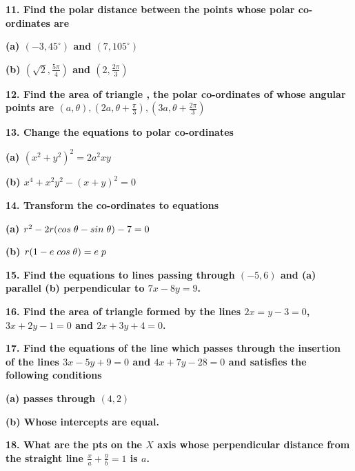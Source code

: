 \documentclass{article}
\begin{document}
\begin{flushleft}
\vspace{0.2cm}
\textbf{11. Find the polar distance between the points whose polar co-ordinates are }\par
\textbf{(a) $(-3, 45^{\circ})$ and $(7, 105^{\circ})$}\par
\textbf{(b) $(\sqrt{2}, \frac{5\pi}{4} )$ and $(2, \frac{2\pi}{3})$}\par
\vspace{0.2cm}
\textbf{12. Find the area of triangle , the polar co-ordinates of whose angular points are $(a , \theta), (2a , \theta+\frac{\pi}{3}), (3a , \theta+\frac{2\pi}{3})$}\par
\vspace{0.2cm}
\textbf{13. Change the equations to polar co-ordinates}\par
\textbf{(a) $(x^2+y^2)^2 = 2a^2xy$}\par
\textbf{(b) $x^4 + x^2y^2 - (x+y)^2 = 0$}\par
\vspace{0.2cm}
\textbf{14. Transform the co-ordinates to equations}\par
\textbf{(a) $r^2-2r(cos\hspace{0.1cm}\theta-sin\hspace{0.1cm}\theta)-7 = 0$}\par
\textbf{(b) $r(1- e\hspace{0.1cm} cos\hspace{0.1cm}\theta) = e\hspace{0.1cm}p$}\par
\vspace{0.2cm}
\textbf{15. Find the equations to lines passing through $(-5,6)$ and (a) parallel (b) perpendicular to $7x-8y = 9$.}\par
\vspace{0.2cm}
\textbf{16. Find the area of triangle formed by the lines $2x=y-3 = 0$, $3x+2y-1 = 0$ and $2x+3y+4 = 0$.}\par
\vspace{0.2cm}
\textbf{17. Find the equations of the line which passes through the insertion of the lines $3x-5y+9 = 0$ and $4x +7y-28 = 0$ and satisfies the following conditions}\par
\textbf{(a) passes through $(4,2)$}\par
\textbf{(b) Whose intercepts are equal. }\par
\vspace{0.2cm}
\textbf{18. What are the pts on the $X$ axis whose perpendicular distance from the straight line $\frac{x}{a} + \frac{y}{b} = 1$ is $a$. }\par

\end{flushleft}
\end{document}

